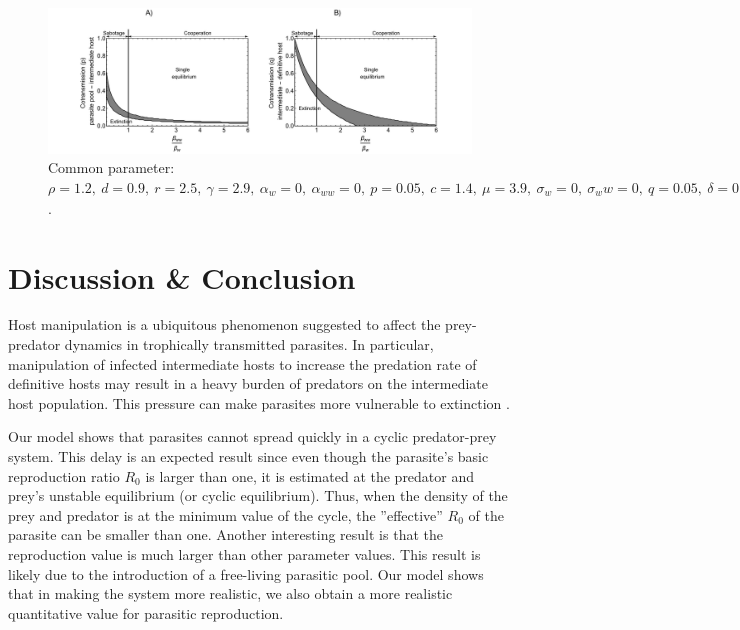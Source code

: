 \documentclass[a4paper]{scrartcl}
\begin{document}
\begin{figure}[!ht]
	\centering
	\includegraphics[width=\textwidth]{Figures/coinfect_transmission.pdf}
	\caption{Common parameter:  $\rho = 1.2, \ d = 0.9, \ r = 2.5, \ \gamma = 2.9, \ \alpha_w = 0, \ \alpha_{ww} = 0, \ p = 0.05, \ c = 1.4, \ \mu = 3.9, \ \sigma_w = 0, \ \sigma_ww = 0, \ q = 0.05, \ \delta = 0.9, \ k = 0.26, \ \epsilon = 4.5, \ \beta_w = 1.3, \ f_w = 35, \ h_1 = h_2 = 0.6$.}
	\label{fig:contransmission}
\end{figure}

\section*{Discussion \& Conclusion}
Host manipulation is a ubiquitous phenomenon suggested to affect the prey-predator dynamics in trophically transmitted parasites. 
In particular, manipulation of infected intermediate hosts to increase the predation rate of definitive hosts may result in a heavy burden of predators on the intermediate host population.
This pressure can make parasites more vulnerable to extinction \citep{Hadeler1989,Fenton2006}. 

Our model shows that parasites cannot spread quickly in a cyclic predator-prey system. 
This delay is an expected result since even though the parasite's basic reproduction ratio $R_0$ is larger than one, it is estimated at the predator and prey's unstable equilibrium (or cyclic equilibrium). 
Thus, when the density of the prey and predator is at the minimum value of the cycle, the ''effective'' $R_0$ of the parasite can be smaller than one. 
Another interesting result is that the reproduction value is much larger than other parameter values.
This result is likely due to the introduction of a free-living parasitic pool. Our model shows that in making the system more realistic, we also obtain a more realistic quantitative value for parasitic reproduction.
\end{document}
